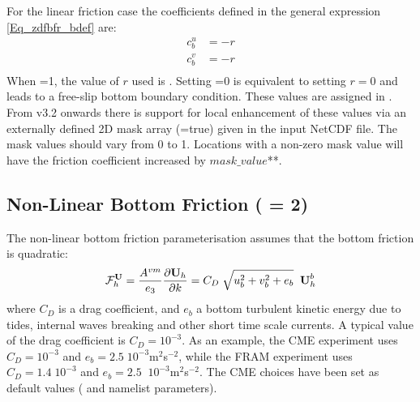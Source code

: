 For the linear friction case the coefficients defined in the general 
expression \eqref{Eq_zdfbfr_bdef} are: 
\begin{equation} \label{Eq_zdfbfr_linbfr_b}
\begin{split}
 c_b^u &= - r\\
 c_b^v &= - r\\
\end{split}
\end{equation}
When =1, the value of $r$ used is . 
Setting =0 is equivalent to setting $r=0$ and leads to a free-slip 
bottom boundary condition. These values are assigned in . 
From v3.2 onwards there is support for local enhancement of these values 
via an externally defined 2D mask array (=true) given
in the  input NetCDF file. The mask values should vary from 0 to 1. 
Locations with a non-zero mask value will have the friction coefficient increased 
by $mask\_value$**.

\subsection{Non-Linear Bottom Friction ( = 2)}
\label{ZDF_bfr_nonlinear}

The non-linear bottom friction parameterisation assumes that the bottom 
friction is quadratic: 
\begin{equation} \label{Eq_zdfbfr_nonlinear}
{\cal F}_h^\textbf{U} = \frac{A^{vm}}{e_3 }\frac{\partial \textbf {U}_h 
}{\partial k}=C_D \;\sqrt {u_b ^2+v_b ^2+e_b } \;\; \textbf {U}_h^b 
\end{equation}
where $C_D$ is a drag coefficient, and $e_b $ a bottom turbulent kinetic energy 
due to tides, internal waves breaking and other short time scale currents. 
A typical value of the drag coefficient is $C_D = 10^{-3} $. As an example, 
the CME experiment \citep{Treguier_JGR92} uses $C_D = 10^{-3}$ and 
$e_b = 2.5\;10^{-3}$m$^2$\;s$^{-2}$, while the FRAM experiment \citep{Killworth1992} 
uses $C_D = 1.4\;10^{-3}$ and $e_b =2.5\;\;10^{-3}$m$^2$\;s$^{-2}$. 
The CME choices have been set as default values ( and  
namelist parameters).

